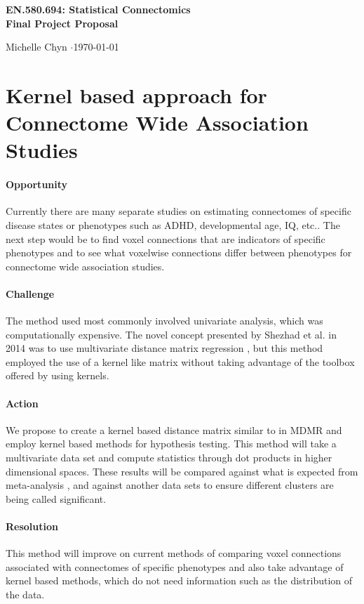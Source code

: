 \documentclass[12pt]{article}
\begin{document}
\begin{center}
\Large\bf EN.580.694: Statistical Connectomics \\
Final Project Proposal
\end{center}
\begin{center}
Michelle Chyn $\cdot$\today
\end{center}

\bigskip

\section*{Kernel based approach for Connectome Wide Association Studies}

\paragraph{Opportunity}
Currently there are many separate studies on estimating connectomes of specific disease states or phenotypes such as ADHD, developmental age, IQ, etc.. The next step would be to find voxel connections that are indicators of specific phenotypes and to see what voxelwise connections differ between phenotypes for connectome wide association studies.

\paragraph{Challenge}
The method used most commonly involved univariate analysis, which was computationally expensive. The novel concept  presented by Shezhad et al. in 2014 was to use multivariate distance matrix regression \cite{Shezhad}, but this method employed the use of a kernel like matrix without taking advantage of the toolbox offered by using kernels.

\paragraph{Action}
We propose to create a kernel based distance matrix similar to in MDMR and employ kernel based methods for hypothesis testing. This method will take a multivariate data set and compute statistics through dot products in higher dimensional spaces. These results will be compared against what is expected from meta-analysis \cite{Neurosynth}, and  against another data sets to ensure different clusters are being called significant.

\paragraph{Resolution}
This method will improve on current methods of comparing voxel connections associated with connectomes of specific phenotypes and also take advantage of kernel based methods, which do not need information such as the distribution of the data.
\end{document}
